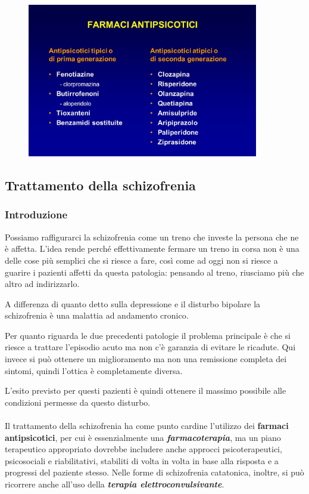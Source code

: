 \begin{figure}[!ht]
\centering
	\includegraphics[width=0.9\textwidth]{07/image1.jpeg}
\end{figure}

\subsection{Trattamento della schizofrenia}

\subsubsection{Introduzione}

Possiamo raffigurarci la schizofrenia come un treno che investe la
persona che ne è affetta. L'idea rende perché effettivamente fermare un
treno in corsa non è una delle cose più semplici che si riesce a fare,
così come ad oggi non si riesce a guarire i pazienti affetti da questa
patologia: pensando al treno, riusciamo più che altro ad indirizzarlo.

A differenza di quanto detto sulla depressione e il disturbo bipolare la
schizofrenia è una malattia ad andamento cronico.

Per quanto riguarda le due precedenti patologie il problema principale è
che si riesce a trattare l'episodio acuto ma non c'è garanzia di evitare
le ricadute. Qui invece si può ottenere un miglioramento ma non una
remissione completa dei sintomi, quindi l'ottica è completamente
diversa.

L'esito previsto per questi pazienti è quindi ottenere il massimo
possibile alle condizioni permesse da questo disturbo.
\\\\
Il trattamento della schizofrenia ha come punto cardine l'utilizzo dei
\textbf{farmaci antipsicotici}, per cui è essenzialmente una
\textbf{\emph{farmacoterapia}}, ma un piano terapeutico appropriato
dovrebbe includere anche approcci psicoterapeutici, psicosociali e
riabilitativi, stabiliti di volta in volta in base alla risposta e a
progressi del paziente stesso. Nelle forme di schizofrenia catatonica,
inoltre, si può ricorrere anche all'uso della \textbf{\emph{terapia
elettroconvulsivante}}.

